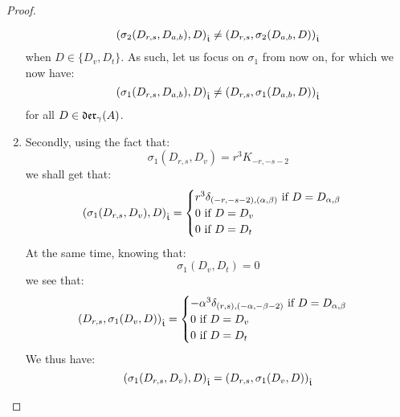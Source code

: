 \begin{proof}
\begin{enumerate}
                        $$\left( \sigma_2(D_{r, s}, D_{a, b}), D \right)_{\hat{\mathfrak{t}}} \not = \left( D_{r, s}, \sigma_2(D_{a, b}, D) \right)_{\hat{\mathfrak{t}}}$$
                    when $D \in \{D_v, D_t\}$. As such, let us focus on $\sigma_1$ from now on, for which we now have:
                        $$\left( \sigma_1(D_{r, s}, D_{a, b}), D \right)_{\hat{\mathfrak{t}}} \not = \left( D_{r, s}, \sigma_1(D_{a, b}, D) \right)_{\hat{\mathfrak{t}}}$$
                    for all $D \in \mathfrak{der}_{\gamma}(A)$.
                    \item Secondly, using the fact that:
                        $$\sigma_1(D_{r, s}, D_v) = r^3 K_{-r, -s - 2}$$
                    we shall get that:
                        $$
                            \left( \sigma_1(D_{r, s}, D_v), D \right)_{\hat{\mathfrak{t}}} =
                            \begin{cases}
                                \text{$r^3 \delta_{(-r, -s - 2), (\alpha, \beta)}$ if $D = D_{\alpha, \beta}$}
                                \\
                                \text{$0$ if $D = D_v$}
                                \\
                                \text{$0$ if $D = D_t$}
                            \end{cases}
                        $$
                    At the same time, knowing that:
                        $$\sigma_1(D_v, D_t) = 0$$
                    we see that:
                        $$
                            \begin{aligned}
                                \left( D_{r, s}, \sigma_1(D_v, D) \right)_{\hat{\mathfrak{t}}} =
                                \begin{cases}
                                    \text{$-\alpha^3 \delta_{(r, s), (-\alpha, -\beta - 2)}$ if $D = D_{\alpha, \beta}$}
                                    \\
                                    \text{$0$ if $D = D_v$}
                                    \\
                                    \text{$0$ if $D = D_t$}
                                \end{cases}
                            \end{aligned}
                        $$
                    We thus have:
                        $$\left( \sigma_1(D_{r, s}, D_v), D \right)_{\hat{\mathfrak{t}}} = \left( D_{r, s}, \sigma_1(D_v, D) \right)_{\hat{\mathfrak{t}}}$$

\end{enumerate}
\end{proof}
